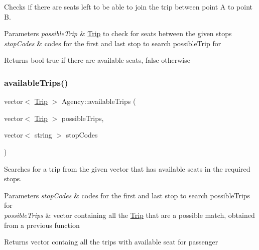 Checks if there are seats left to be able to join the trip between point A to point B. 


\begin{DoxyParams}{Parameters}
{\em possible\+Trip} & \hyperlink{class_trip}{Trip} to check for seats between the given stops \\
\hline
{\em stop\+Codes} & codes for the first and last stop to search possible\+Trip for\\
\hline
\end{DoxyParams}
\begin{DoxyReturn}{Returns}
bool true if there are available seats, false otherwise 
\end{DoxyReturn}
\mbox{\label{group___agency_ga892474fd8930e8e78e743e2b185b35ac}} 
\subsubsection{\texorpdfstring{available\+Trips()}{availableTrips()}}
{\footnotesize\ttfamily vector$<$ \hyperlink{class_trip}{Trip} $>$ Agency\+::available\+Trips (\begin{DoxyParamCaption}\item[{vector$<$ \hyperlink{class_trip}{Trip} $>$}]{possible\+Trips,  }\item[{vector$<$ string $>$}]{stop\+Codes }\end{DoxyParamCaption})}



Searches for a trip from the given vector that has available seats in the required stops. 


\begin{DoxyParams}{Parameters}
{\em stop\+Codes} & codes for the first and last stop to search possible\+Trips for \\
\hline
{\em possible\+Trips} & vector containing all the \hyperlink{class_trip}{Trip} that are a possible match, obtained from a previous function\\
\hline
\end{DoxyParams}
\begin{DoxyReturn}{Returns}
vector containg all the trips with available seat for passenger 
\end{DoxyReturn}
\mbox{\label{group___agency_ga51d72590b842d0df300cd39846353f00}} 
